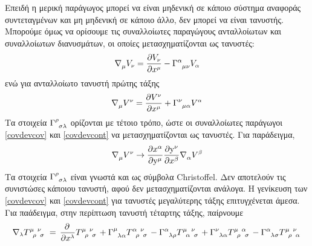 Επειδή η μερική παράγωγος μπορεί να είναι μηδενική σε κάποιο σύστημα αναφοράς συντεταγμένων και μη μηδενική σε κάποιο άλλο, δεν μπορεί να είναι τανυστής. Μπορούμε όμως να ορίσουμε τις συναλλοίωτες παραγώγους ανταλλοίωτων και συναλλοίωτων διανυσμάτων, οι οποίες μετασχηματίζονται ως τανυστές: 
\begin{equation}\label{covdevcov}
    \nabla\indices{_\mu}V\subscr{\nu} = \pd{V\subscr{\nu}}{x\superscr{\mu}} - \Gamma\indices{^\alpha_\mu_\nu} V\subscr{\alpha}
\end{equation}
ενώ για ανταλλοίωτο τανυστή πρώτης τάξης
\begin{equation}\label{covdevcont}
    \nabla\indices{_\mu}V\superscr{\nu} = \pd{V\superscr{\nu}}{x\superscr{\mu}} + \Gamma\indices{^\nu_\mu_\alpha} V\superscr{\alpha}
\end{equation}
Τα στοιχεία $\Gamma\indices{^\rho_\sigma_\lambda}$ ορίζονται με τέτοιο τρόπο, ώστε οι συναλλοίωτες παράγωγοι \eqref{covdevcov} και \eqref{covdevcont} να μετασχηματίζονται ως τανυστές. Για παράδειγμα,
\begin{equation*}
    \nabla\indices{_\mu}V\superscr{\nu} \rightarrow \L[i]{\alpha}{\mu}\L{\nu}{\beta}\nabla\indices{_\alpha}V\superscr{\beta}
\end{equation*}
Τα στοιχεία $\Gamma\indices{^\rho_\sigma_\lambda}$ είναι γνωστά και ως σύμβολα Christoffel. Δεν αποτελούν τις συνιστώσες κάποιου τανυστή, αφού δεν μετασχηματίζονται ανάλογα. Η γενίκευση των \eqref{covdevcov} και \eqref{covdevcont} για τανυστές μεγαλύτερης τάξης επιτυγχένεται άμεσα. Για παάδειγμα, στην περίπτωση τανυστή τέταρτης τάξης, παίρνουμε
\begin{equation*}
    \nabla\subscr{\lambda}T\indices{^\mu_\rho^\nu_\sigma} \,=\, \pd{\,}{x\superscr{\lambda}} T\indices{^\mu_\rho^\nu_\sigma}+ \Gamma\indices{^\mu_\lambda_\alpha}T\indices{^\alpha_\rho^\nu_\sigma} - \Gamma\indices{^\alpha_\lambda_\rho}T\indices{^\mu_\alpha^\nu_\sigma} + \Gamma\indices{^\nu_\lambda_\alpha}T\indices{^\mu_\rho^\alpha_\sigma} - \Gamma\indices{^\alpha_\lambda_\sigma}T\indices{^\mu_\rho^\nu_\alpha}
\end{equation*}
